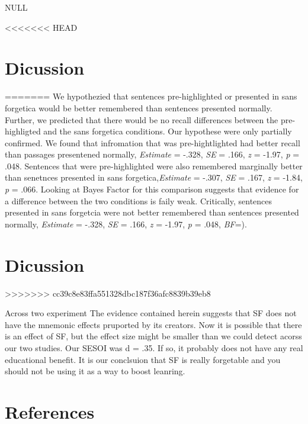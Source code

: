 \documentclass[pdf]{apa6}
\begin{document}
NULL

<<<<<<< HEAD
\hypertarget{dicussion}{%
\section{Dicussion}\label{dicussion}}
=======
We hypothezied that sentences pre-highlighted or presented in sans forgetica would be better remembered than sentences presented normally. Further, we predicted that there would be no recall differences between the pre-highligted and the sans forgetica conditions. Our hypothese were only partially confirmed. We found that infromation that was pre-hightlighted had better recall than passages presentened normally, \emph{Estimate} = -.328, \emph{SE} = .166, \emph{z} = -1.97, \emph{p} = .048. Sentences that were pre-highlighted were also remembered marginally better than senetnces presented in sans forgetica,\emph{Estimate} = -.307, \emph{SE} = .167, \emph{z} = -1.84, \emph{p} = .066. Looking at Bayes Factor for this comparison suggests that evidence for a difference between the two conditions is faily weak. Critically, sentences presented in sans forgetcia were not better remembered than sentences presented normally, \emph{Estimate} = -.328, \emph{SE} = .166, \emph{z} = -1.97, \emph{p} = .048, \emph{BF}=).

\hypertarget{dicussion-1}{%
\section{Dicussion}\label{dicussion-1}}
>>>>>>> cc39c8e83ffa551328dbc187f36afc8839b39eb8

Across two experiment
The evidence contained herein suggests that SF does not have the mnemonic effects pruported by its creators. Now it is possible that there is an effect of SF, but the effect size might be smaller than we could detect acorss our two studies. Our SESOI was d = .35. If so, it probably does not have any real educational benefit. It is our conclsuion that SF is really forgetable and you should not be using it as a way to boost leanring.

\newpage

\hypertarget{references}{%
\section{References}\label{references}}

\begingroup
\setlength{\parindent}{-0.5in}
\setlength{\leftskip}{0.5in}

\hypertarget{refs}{}

\endgroup
\end{document}
